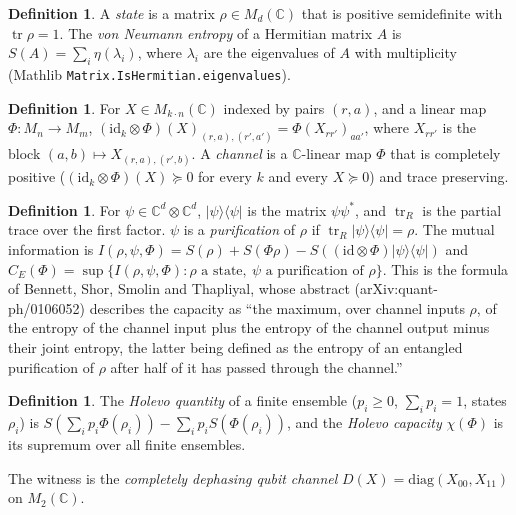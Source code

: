\documentclass[11pt]{article}
\theoremstyle{definition}
\newtheorem{definition}[theorem]{Definition}
\newcommand{\tr}{\operatorname{tr}}
\newcommand{\nml}{\eta}
\begin{document}
\begin{definition}
A \emph{state} is a matrix $\rho\in M_d(\mathbb{C})$ that is positive semidefinite with
$\tr\rho=1$. The \emph{von Neumann entropy} of a Hermitian matrix $A$ is
$S(A)=\sum_i \nml(\lambda_i)$, where $\lambda_i$ are the eigenvalues of $A$ with multiplicity
(Mathlib \texttt{Matrix.IsHermitian.eigenvalues}).
\end{definition}

\begin{definition}
For $X\in M_{k\cdot n}(\mathbb{C})$ indexed by pairs $(r,a)$, and a linear map
$\Phi:M_n\to M_m$, $(\mathrm{id}_k\otimes\Phi)(X)_{(r,a),(r',a')}=\Phi(X_{rr'})_{aa'}$, where
$X_{rr'}$ is the block $(a,b)\mapsto X_{(r,a),(r',b)}$. A \emph{channel} is a $\mathbb{C}$-linear
map $\Phi$ that is completely positive ($(\mathrm{id}_k\otimes\Phi)(X)\succeq 0$ for every $k$ and
every $X\succeq 0$) and trace preserving.
\end{definition}

\begin{definition}
For $\psi\in\mathbb{C}^d\otimes\mathbb{C}^d$, $|\psi\rangle\langle\psi|$ is the matrix
$\psi\psi^*$, and $\tr_R$ is the partial trace over the first factor. $\psi$ is a
\emph{purification} of $\rho$ if $\tr_R|\psi\rangle\langle\psi|=\rho$. The mutual information is
$I(\rho,\psi,\Phi)=S(\rho)+S(\Phi\rho)-S((\mathrm{id}\otimes\Phi)|\psi\rangle\langle\psi|)$ and
$C_E(\Phi)=\sup\{I(\rho,\psi,\Phi):\rho \text{ a state},\ \psi \text{ a purification of } \rho\}$.
This is the formula of Bennett, Shor, Smolin and Thapliyal, whose abstract
(arXiv:quant-ph/0106052) describes the capacity as ``the maximum, over channel inputs $\rho$, of the
entropy of the channel input plus the entropy of the channel output minus their joint entropy, the
latter being defined as the entropy of an entangled purification of $\rho$ after half of it has
passed through the channel.''
\end{definition}

\begin{definition}
The \emph{Holevo quantity} of a finite ensemble ($p_i\ge 0$, $\sum_i p_i=1$, states $\rho_i$) is
$S(\sum_i p_i\Phi(\rho_i))-\sum_i p_i S(\Phi(\rho_i))$, and the \emph{Holevo capacity}
$\chi(\Phi)$ is its supremum over all finite ensembles.
\end{definition}

The witness is the \emph{completely dephasing qubit channel}
$D(X)=\mathrm{diag}(X_{00},X_{11})$ on $M_2(\mathbb{C})$.
\end{document}
